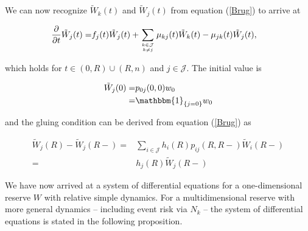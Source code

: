 \documentclass{book}
\newcommand{\1}[1]{\mathbbm{1}_{\left\lbrace #1 \right\rbrace}}
\theoremstyle{break}
\theoremstyle{remark}
\numberwithin{equation}{section}
\begin{document}
We can now recognize $\tilde{W}_k(t)$ and $\tilde{W}_j(t)$ from equation (\ref{Brug}) to arrive at

\begin{align*}
	\frac{\partial}{\partial t} \tilde{W}_j(t) =& f_j(t) \tilde{W}_j(t) + \sum_{k \in \mathcal{J} \atop k \neq j} \mu_{kj}(t) \tilde{W}_k(t) - \mu_{jk}(t) \tilde{W}_j(t),
\end{align*}

which holds for $t \in (0,R)\cup(R,n)$ and $j \in \mathcal{J}$. The initial value is

\begin{align*}
	\tilde{W}_j(0) =& p_{0j}(0,0) w_0 \\
	=& \1{j=0} w_0
\end{align*}

and the gluing condition can be derived from equation (\ref{Brug}) as

\begin{align*}
	\tilde{W}_j(R) - \tilde{W}_j(R-) =& \sum_{i \in \mathcal{J}} h_{i}(R) p_{ij}(R,R-) \tilde{W}_i(R-) \\
	=& h_{j}(R) \tilde{W}_j(R-)
\end{align*}

We have now arrived at a system of differential equations for a one-dimensional reserve $W$ with relative simple dynamics. For a multidimensional reserve with more general dynamics -- including event risk via $N_k$ -- the system of differential equations is stated in the following proposition.
\end{document}
